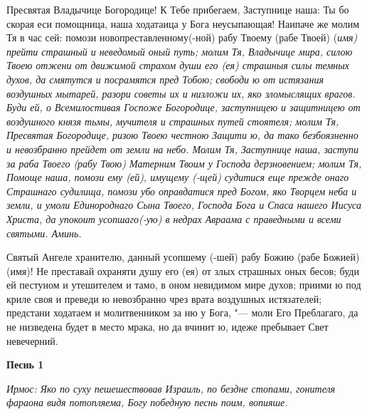 \mychapterending

 


Пресвятая Владычице Богородице! К Тебе прибегаем, Заступнице наша: Ты бо скорая еси помощница, наша ходатаица у Бога неусыпающая! Наипаче же молим Тя в час сей: помози новопреставленному(-ной) рабу Твоему (рабе Твоей) (\itshape имя\normalfont{}) прейти страшный и неведомый оный путь; молим Тя, Владычице мира, силою Твоею отжени от движимой страхом души его (ея) страшныя силы темных духов, да смятутся и посрамятся пред Тобою; свободи ю от истязания воздушных мытарей, разори советы их и низложи их, яко зломыслящих врагов. Буди ей, о Всемилостивая Госпоже Богородице, заступницею и защитницею от воздушного князя тьмы, мучителя и страшных путей стоятеля; молим Тя, Пресвятая Богородице, ризою Твоею честною Защити ю, да тако безбоязненно и невозбранно прейдет от земли на небо. Молим Тя, Заступнице наша, заступи за раба Твоего (рабу Твою) Матерним Твоим у Господа дерзновением; молим Тя, Помоще наша, помози ему (ей), имущему (-щей) судитися еще прежде онаго Страшнаго судилища, помози убо оправдатися пред Богом, яко Творцем неба и земли, и умоли Единороднаго Сына Твоего, Господа Бога и Спаса нашего Иисуса Христа, да упокоит усопшаго(-ую) в недрах Авраама с праведными и всеми святыми. Аминь.


\mychapterending

 


Святый Ангеле хранителю, данный усопшему (-шей) рабу Божию (рабе Божией) (имя)! Не преставай охраняти душу его (ея) от злых страшных оных бесов; буди ей пестуном и утешителем и тамо, в оном невидимом мире духов; приими ю под криле своя и преведи ю невозбранно чрез врата воздушных истязателей; предстани ходатаем и молитвенником за ню у Бога, "--- моли Его Преблагаго, да не низведена будет в место мрака, но да вчинит ю, идеже пребывает Свет невечерний. 


\mychapterending

 


\bfseries Песнь 1\normalfont{}


\itshape Ирмос:\normalfont{} Яко по суху пешешествовав Израиль, по бездне стопами, гонителя фараона видя потопляема, Богу победную песнь поим, вопияше. 

